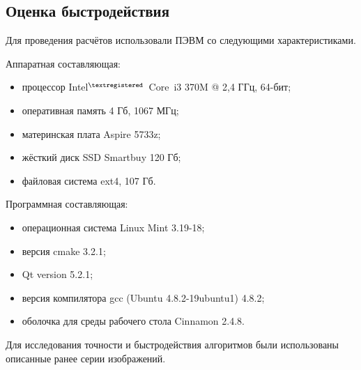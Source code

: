 \subsection {Оценка быстродействия}
Для проведения расчётов использовали ПЭВМ со следующими характеристиками.

Аппаратная составляющая:
\begin{itemize}
\item процессор Intel$^{\textregistered}$~Core\texttrademark~i3 370M @ 2,4 ГГц, 64-бит;
\item оперативная память 4 Гб, 1067 МГц;
\item материнская плата Aspire 5733z;
\item жёсткий диск SSD Smartbuy 120 Гб;
\item файловая система ext4, 107 Гб.
\end{itemize}

Программная составляющая:
\begin{itemize}
\item операционная система Linux Mint 3.19-18;
\item версия cmake 3.2.1;
\item Qt version 5.2.1;
\item версия компилятора gcc (Ubuntu 4.8.2-19ubuntu1) 4.8.2;
\item оболочка для среды рабочего стола Cinnamon 2.4.8.
\end{itemize}

Для исследования точности и быстродействия  алгоритмов были использованы описанные ранее серии изображений.